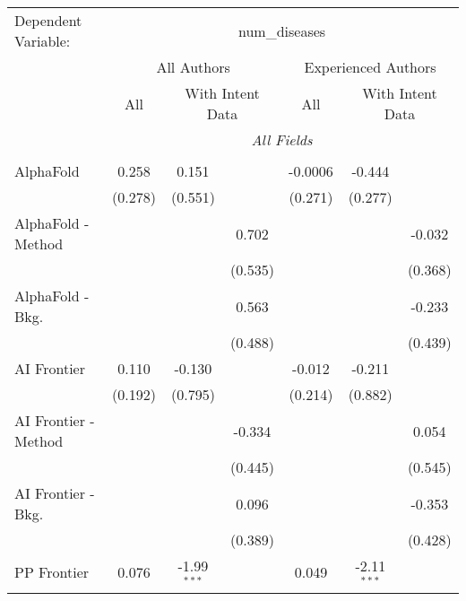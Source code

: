\begingroup
\centering
\begin{tabular}{lcccccc}
   \tabularnewline \midrule \midrule
   Dependent Variable: & \multicolumn{6}{c}{num\_diseases}\\
 & \multicolumn{3}{c}{All Authors} & \multicolumn{3}{c}{Experienced Authors} \\
\cmidrule(lr){2-4} \cmidrule(lr){5-7}
 & \multicolumn{1}{c}{All} & \multicolumn{2}{c}{With Intent Data} & \multicolumn{1}{c}{All} & \multicolumn{2}{c}{With Intent Data} \\
\cmidrule(lr){2-2} \cmidrule(lr){3-4} \cmidrule(lr){5-5} \cmidrule(lr){6-7}
 & \multicolumn{6}{c}{\textit{All Fields}} \\ \\
   AlphaFold            & 0.258   & 0.151         &             & -0.0006 & -0.444        &   \\   
                        & (0.278) & (0.551)       &             & (0.271) & (0.277)       &   \\   
   AlphaFold - Method   &         &               & 0.702       &         &               & -0.032\\   
                        &         &               & (0.535)     &         &               & (0.368)\\   
   AlphaFold - Bkg.     &         &               & 0.563       &         &               & -0.233\\   
                        &         &               & (0.488)     &         &               & (0.439)\\   
   AI Frontier          & 0.110   & -0.130        &             & -0.012  & -0.211        &   \\   
                        & (0.192) & (0.795)       &             & (0.214) & (0.882)       &   \\   
   AI Frontier - Method &         &               & -0.334      &         &               & 0.054\\   
                        &         &               & (0.445)     &         &               & (0.545)\\   
   AI Frontier - Bkg.   &         &               & 0.096       &         &               & -0.353\\   
                        &         &               & (0.389)     &         &               & (0.428)\\   
   PP Frontier          & 0.076   & -1.99$^{***}$ &             & 0.049   & -2.11$^{***}$ &   \\   

\end{tabular}
